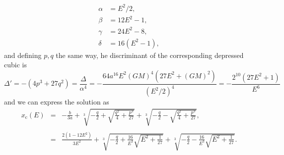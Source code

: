 \documentclass[11pt]{article}
\newcommand{\rc}{\mathrm{c}}
\newcommand{\xc}{x_{\rc}}
\begin{document}
\begin{appendices}
\begin{align*}
   \alpha &= E^{2}/2, \\
  \beta &= 12E^{2}-1 ,\\
  \gamma &= 24E^{2}-8,\\
  \delta &= 16(E^{2}-1) ,
\end{align*}
and defining $p,q$ the same way, he discriminant of the corresponding depressed cubic is $$\Delta'=-(4p^{3}+27q^{2})=\frac{\Delta}{\alpha^{4}}=-\frac{64a^{16}E^{2}(GM)^{4}(27E^{2}+(GM)^{2})}{( E^{2}/2)^{4}}=-\frac{2^{10}(27E^{2}+1)}{E^{6}}$$  and we can express the solution as
\begin{equation}
  \begin{array}{ccl}
    \xc(E) &=& \displaystyle{-\frac{b}{3a} + \sqrt[3]{-\frac{q}{2}+\sqrt{\frac{q^{2}}{4}+\frac{p^{3}}{27}}} + \sqrt[3]{-\frac{q}{2}-\sqrt{\frac{q^{2}}{4}+\frac{p^{3}}{27}}}} , \\
    {}&{}&{} \\
    {} &=& \displaystyle{\frac{2(1-12E^{2})}{3E^{2}} + \sqrt[3]{-\frac{q}{2}+\frac{16}{E^{3}}\sqrt{E^{2}+\frac{1}{27}}} + \sqrt[3]{-\frac{q}{2}-\frac{16}{E^{3}}\sqrt{E^{2}+\frac{1}{27}}}} .
    \end{array}
  \label{eq:xcPlummer}
  \end{equation}


\end{appendices}
\end{document}
